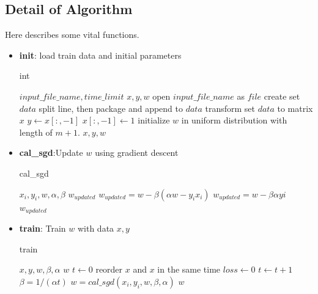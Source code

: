 \documentclass[conference,compsoc]{IEEEtran}
\renewcommand{\algorithmicrequire}{\textbf{Input:}}
\renewcommand{\algorithmicensure}{\textbf{Output:}}
\begin{document}
\subsection{Detail of Algorithm}
Here describes some vital functions.
\begin{itemize}
    \item \textbf{init}: load train data and initial parameters
    \begin{algorithm}[H]
     \caption{int}
     \begin{algorithmic}[1]
     \renewcommand{\algorithmicrequire}{\textbf{Input:}}
     \renewcommand{\algorithmicensure}{\textbf{Output:}}
     \REQUIRE $input\_file\_name, time\_limit$
     \ENSURE $x, y, w$
     \STATE open $input\_file\_name$ as $file$
     \STATE create set $data$
          \STATE split line, then package and append to $data$
     \ENDFOR
     \STATE transform set $data$ to matrix $x$
     \STATE $y \leftarrow x[:,-1]$ 
     \STATE $x[:, -1] \leftarrow 1$
     \STATE initialize $w$ in uniform distribution with length of $m+1$. 
     \RETURN $x, y, w$
     \end{algorithmic}
   \end{algorithm}

   \item \textbf{cal\_sgd}:Update $w$ using gradient descent
     \begin{algorithm}[H]
     \caption{cal\_sgd}
     \begin{algorithmic}[2]
     \renewcommand{\algorithmicrequire}{\textbf{Input:}}
     \renewcommand{\algorithmicensure}{\textbf{Output:}}
     \REQUIRE $x_i, y_i, w, \alpha, \beta$
     \ENSURE $w_{updated}$ 
	     \STATE $w_{updated} = w - \beta(\alpha w - y_ix_i)$
     \ELSE
	     \STATE $w_{updated} = w - \beta\alpha yi$
     \ENDIF
     \RETURN $w_{updated}$
     \end{algorithmic}
     \end{algorithm}

  \item \textbf{train}: Train $w$ with data $x, y$
    \begin{algorithm}[H]
     \caption{train}
     \begin{algorithmic}[3]
     \renewcommand{\algorithmicrequire}{\textbf{Input:}}
     \renewcommand{\algorithmicensure}{\textbf{Output:}}
     \REQUIRE $x, y, w,\beta, \alpha$
     \ENSURE  $w$
     \STATE $t \leftarrow 0$
	     \STATE reorder $x$ and $x$ in the same time
	     \STATE $loss \leftarrow 0$ 
	     \STATE $t \leftarrow t+1$
	     \STATE $\beta = 1/(\alpha t)$
		  \STATE $w = cal\_sgd(x_i, y_i, w, \beta, \alpha)$
	     \ENDFOR
     \ENDWHILE
     \RETURN $w$
     \end{algorithmic}
     \end{algorithm}
 

\end{itemize}
\end{document}

